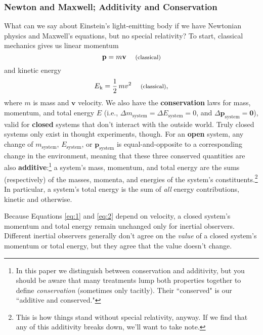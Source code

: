 \documentclass[12pt]{article}
\renewcommand{\vv}[1]{\mathbf{#1}}
\begin{document}
\subsubsection{Newton and Maxwell; Additivity and Conservation}

What can we say about Einstein's light-emitting body if we have Newtonian physics and Maxwell's equations, but no special relativity? To start, classical mechanics gives us linear momentum
\begin{equation}\label{eq:1}
\vv p=m\vv v \quad \text{\footnotesize{ (classical)}}
\end{equation}
and kinetic energy
\begin{equation}\label{eq:2}
E_{\mkern.5mu \textrm{k}}= \frac{1}{2} \, m v ^2 \quad \text{\footnotesize{ (classical)}},
\end{equation}
where $m$ is mass and $\vv{v}$ velocity. We also have the \textbf{conservation} laws for mass, momentum, and total energy $E$ (i.e., $\Delta m_{\mathrm{system}} = \Delta E_{\mathrm{system}} = 0$, and $\Delta \vv p_{\mathrm{system}} = \vv 0$), valid for \textbf{closed} systems that don't interact with the outside world. Truly closed systems only exist in thought experiments, though. For an \textbf{open} system, any change of $m_{\mathrm{system}}$, $E_{\mathrm{system}}$, or $\vv p_{\mathrm{system}}$ is equal-and-opposite to a corresponding change in the environment, meaning that these three conserved quantities are also \textbf{additive}:\footnote{In this paper we distinguish between conservation and additivity, but you should be aware that many treatments lump both properties together to define \emph{conservation} (sometimes only tacitly). Their ``conserved" is our ``additive and conserved."} a system's mass, momentum, and total energy are the sums (respectively) of the masses, momenta, and energies of the system's constituents.\footnote{\label{fn:ad}This is how things stand without special relativity, anyway. If we find that any of this additivity breaks down, we'll want to take note.} In particular, a system's total energy is the sum of \emph{all} energy contributions, kinetic and otherwise.

Because Equations \ref{eq:1} and \ref{eq:2} depend on velocity, a closed system's momentum and total energy remain unchanged only for inertial observers. Different inertial observers generally don't agree on the \emph{value} of a closed system's momentum or total energy, but they agree that the value doesn't change.
\end{document}
